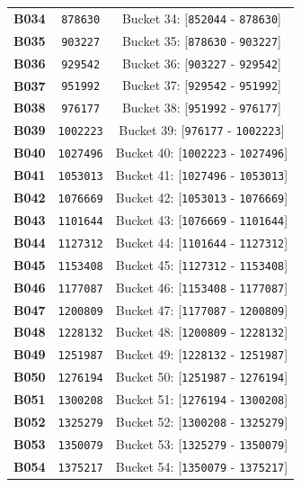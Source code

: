 \documentclass[11pt,a4paper]{article}
\begin{document}
{{\begin{xltabular}{\textwidth}{l | C | C}
\textbf{B034} & \texttt{878630} & Bucket 34: [\texttt{852044} - \texttt{878630}] \\
\textbf{B035} & \texttt{903227} & Bucket 35: [\texttt{878630} - \texttt{903227}] \\
\textbf{B036} & \texttt{929542} & Bucket 36: [\texttt{903227} - \texttt{929542}] \\
\textbf{B037} & \texttt{951992} & Bucket 37: [\texttt{929542} - \texttt{951992}] \\
\textbf{B038} & \texttt{976177} & Bucket 38: [\texttt{951992} - \texttt{976177}] \\
\textbf{B039} & \texttt{1002223} & Bucket 39: [\texttt{976177} - \texttt{1002223}] \\
\textbf{B040} & \texttt{1027496} & Bucket 40: [\texttt{1002223} - \texttt{1027496}] \\
\textbf{B041} & \texttt{1053013} & Bucket 41: [\texttt{1027496} - \texttt{1053013}] \\
\textbf{B042} & \texttt{1076669} & Bucket 42: [\texttt{1053013} - \texttt{1076669}] \\
\textbf{B043} & \texttt{1101644} & Bucket 43: [\texttt{1076669} - \texttt{1101644}] \\
\textbf{B044} & \texttt{1127312} & Bucket 44: [\texttt{1101644} - \texttt{1127312}] \\
\textbf{B045} & \texttt{1153408} & Bucket 45: [\texttt{1127312} - \texttt{1153408}] \\
\textbf{B046} & \texttt{1177087} & Bucket 46: [\texttt{1153408} - \texttt{1177087}] \\
\textbf{B047} & \texttt{1200809} & Bucket 47: [\texttt{1177087} - \texttt{1200809}] \\
\textbf{B048} & \texttt{1228132} & Bucket 48: [\texttt{1200809} - \texttt{1228132}] \\
\textbf{B049} & \texttt{1251987} & Bucket 49: [\texttt{1228132} - \texttt{1251987}] \\
\textbf{B050} & \texttt{1276194} & Bucket 50: [\texttt{1251987} - \texttt{1276194}] \\
\textbf{B051} & \texttt{1300208} & Bucket 51: [\texttt{1276194} - \texttt{1300208}] \\
\textbf{B052} & \texttt{1325279} & Bucket 52: [\texttt{1300208} - \texttt{1325279}] \\
\textbf{B053} & \texttt{1350079} & Bucket 53: [\texttt{1325279} - \texttt{1350079}] \\
\textbf{B054} & \texttt{1375217} & Bucket 54: [\texttt{1350079} - \texttt{1375217}] \\

\end{xltabular}}}
\end{document}
